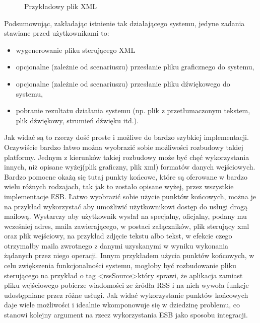 \setlength\fboxsep{20pt}
\setlength\fboxrule{1pt}
\begin{figure}[!h]
	\centering
	\caption{Przykładowy plik XML}
\end{figure}

Podsumowując, zakładając istnienie tak działającego systemu, jedyne zadania stawiane przed użytkownikami to:
\begin{itemize}
	\item wygenerowanie pliku sterującego XML
	\item opcjonalne (zależnie od scenariuszu) przesłanie pliku graficznego do systemu,
	\item opcjonalne (zależnie od scenariuszu) przesłanie pliku dźwiękowego do systemu,
	\item pobranie rezultatu działania systemu (np. plik z przetłumaczonym tekstem, plik dźwiękowy, strumień dźwięku itd.).
\end{itemize}
Jak widać są to rzeczy dość proste i możliwe do bardzo szybkiej implementacji. Oczywiście bardzo łatwo można wyobrazić sobie możliwości rozbudowy takiej platformy. Jednym z kierunków takiej rozbudowy może być chęć wykorzystania innych, niż opisane wyżej(plik graficzny, plik xml) formatów danych wejściowych.  Bardzo pomocne okażą się tutaj punkty końcowe, które są oferowane w bardzo wielu różnych rodzajach, tak jak to zostało opisane wyżej, przez wszystkie implementacje ESB. Łatwo wyobrazić sobie użycie punktów końcowych, można je na przykład wykorzystać aby umożliwić użytkownikowi dostęp do usługi drogą mailową. Wystarczy aby użytkownik wysłał na specjalny, oficjalny, podany mu wcześniej adres, maila zawierającego, w postaci załączników, plik sterujący xml oraz plik wejściowy, na przykład zdjęcie tekstu albo tekst, w efekcie czego otrzymałby maila zwrotnego z danymi uzyskanymi w wyniku wykonania żądanych przez niego operacji. Innym przykładem użycia punktów końcowych, w celu zwiększenia funkcjonalności systemu, mogłoby być rozbudowanie pliku sterującego na przykład o tag \textless rssSource\textgreater który sprawi, że aplikacja zamiast pliku wejściowego pobierze wiadomości ze źródła RSS i na nich wywoła funkcje udostępniane przez różne usługi. Jak widać wykorzystanie punktów końcowych daje wiele możliwości i idealnie wkomponowuje się w dziedzinę problemu, co stanowi kolejny argument na rzecz wykorzystania ESB jako sposobu integracji. \\

